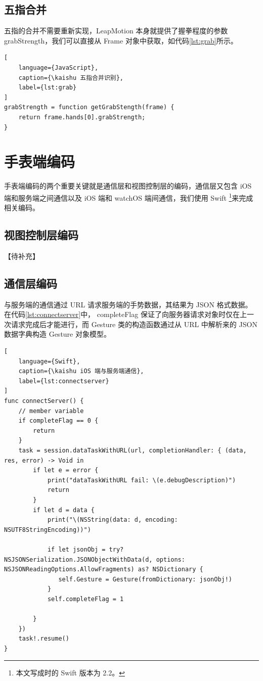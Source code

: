 \subsection{五指合并}

五指的合并不需要重新实现，LeapMotion 本身就提供了握拳程度的参数 grabStrength，我们可以直接从 Frame 对象中获取，如代码\ref{lst:grab}所示。

\begin{lstlisting}[
    language={JavaScript},
    caption={\kaishu 五指合并识别},
    label={lst:grab}
]
grabStrength = function getGrabStength(frame) {
    return frame.hands[0].grabStrength;
}
\end{lstlisting}

\section{手表端编码}

手表端编码的两个重要关键就是通信层和视图控制层的编码，通信层又包含 iOS 端和服务端之间通信以及 iOS 端和 watchOS 端间通信，我们使用 Swift \footnote{本文写成时的 Swift 版本为 2.2。}来完成相关编码\cite{swift2015, swiftoc2015}。

\subsection{视图控制层编码}

【待补充】

\subsection{通信层编码}

与服务端的通信通过 URL 请求服务端的手势数据，其结果为 JSON 格式数据。在代码\ref{lst:connectserver}中， completeFlag 保证了向服务器请求对象时仅在上一次请求完成后才能进行，而 Gesture 类的构造函数通过从 URL 中解析来的 JSON 数据字典构造 Gesture 对象模型。

\begin{lstlisting}[
    language={Swift},
    caption={\kaishu iOS 端与服务端通信},
    label={lst:connectserver}
]
func connectServer() {
    // member variable
    if completeFlag == 0 {
        return
    }
    task = session.dataTaskWithURL(url, completionHandler: { (data, res, error) -> Void in
        if let e = error {
            print("dataTaskWithURL fail: \(e.debugDescription)")
            return
        }
        if let d = data {
            print("\(NSString(data: d, encoding: NSUTF8StringEncoding))")

            if let jsonObj = try? NSJSONSerialization.JSONObjectWithData(d, options: NSJSONReadingOptions.AllowFragments) as? NSDictionary {
               self.Gesture = Gesture(fromDictionary: jsonObj!)
            }
            self.completeFlag = 1

        }
    })
    task!.resume()
}
\end{lstlisting}

